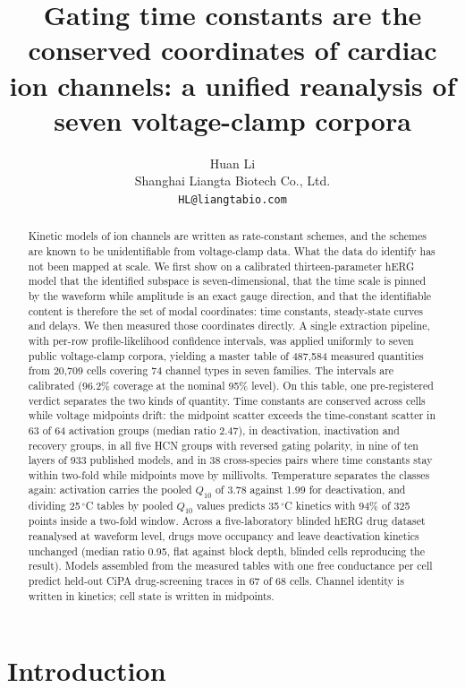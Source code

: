 \documentclass[11pt,a4paper]{article}
\title{\bfseries Gating time constants are the conserved coordinates of cardiac
ion channels: a unified reanalysis of seven voltage-clamp corpora}
\author{Huan Li\\
\small Shanghai Liangta Biotech Co., Ltd.\\
\small \texttt{HL@liangtabio.com}}
\date{}
\begin{document}
\maketitle

\begin{abstract}
\noindent
Kinetic models of ion channels are written as rate-constant schemes, and the
schemes are known to be unidentifiable from voltage-clamp data. What the data
do identify has not been mapped at scale. We first show on a calibrated
thirteen-parameter hERG model that the identified subspace is seven-dimensional,
that the time scale is pinned by the waveform while amplitude is an exact gauge
direction, and that the identifiable content is therefore the set of modal
coordinates: time constants, steady-state curves and delays. We then measured
those coordinates directly. A single extraction pipeline, with per-row
profile-likelihood confidence intervals, was applied uniformly to seven public
voltage-clamp corpora, yielding a master table of 487,584 measured quantities
from 20,709 cells covering 74 channel types in seven families. The intervals
are calibrated (96.2\% coverage at the nominal 95\% level). On this table, one
pre-registered verdict separates the two kinds of quantity. Time constants are
conserved across cells while voltage midpoints drift: the midpoint scatter
exceeds the time-constant scatter in 63 of 64 activation groups (median ratio
2.47), in deactivation, inactivation and recovery groups, in all five HCN
groups with reversed gating polarity, in nine of ten layers of 933 published
models, and in 38 cross-species pairs where time constants stay within two-fold
while midpoints move by millivolts. Temperature separates the classes again:
activation carries the pooled $Q_{10}$ of 3.78 against 1.99 for deactivation,
and dividing 25\,$^\circ$C tables by pooled $Q_{10}$ values predicts 35\,$^\circ$C
kinetics with 94\% of 325 points inside a two-fold window. Across a
five-laboratory blinded hERG drug dataset reanalysed at waveform level, drugs
move occupancy and leave deactivation kinetics unchanged (median ratio 0.95,
flat against block depth, blinded cells reproducing the result). Models
assembled from the measured tables with one free conductance per cell predict
held-out CiPA drug-screening traces in 67 of 68 cells. Channel identity is
written in kinetics; cell state is written in midpoints.
\end{abstract}

\section{Introduction}
\end{document}
